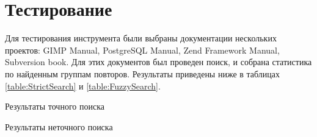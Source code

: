\documentclass[14pt]{matmex-diploma-custom}
\begin{document}



\section{Тестирование}

Для тестирования инструмента были выбраны документации нескольких проектов: GIMP Manual, PostgreSQL Manual, Zend Framework Manual, Subversion book. Для этих документов был проведен поиск, и собрана статистика по найденным группам повторов. Результаты приведены ниже в таблицах \ref{table:StrictSearch} и \ref{table:FuzzySearch}.

\begin{table}[ht]
	\centering
	
	\caption{Результаты точного поиска}
	\label{table:StrictSearch}
\end{table}

\begin{table}[ht!]
	\centering
	
	\caption{Результаты неточного поиска}
	\label{table:FuzzySearch}
\end{table}


\clearpage
\end{document}

